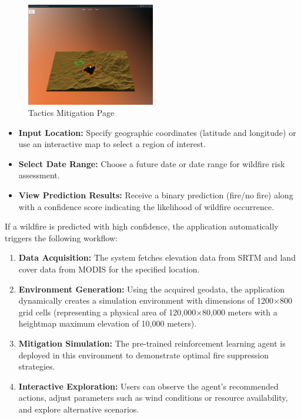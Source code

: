 \documentclass[conference]{IEEEtran}
\begin{document}
        \begin{figure}[H]
            \centering
            \includegraphics[width=0.5\textwidth]{tactix.png}
            \caption{Tactics Mitigation Page}
            \end{figure}
\begin{itemize}
    \item \textbf{Input Location:} Specify geographic coordinates (latitude and longitude) or use an interactive map to select a region of interest.
    
    \item \textbf{Select Date Range:} Choose a future date or date range for wildfire risk assessment.
    
    \item \textbf{View Prediction Results:} Receive a binary prediction (fire/no fire) along with a confidence score indicating the likelihood of wildfire occurrence.
\end{itemize}

\noindent
If a wildfire is predicted with high confidence, the application automatically triggers the following workflow:

\begin{enumerate}
    \item \textbf{Data Acquisition:} The system fetches elevation data from SRTM and land cover data from MODIS for the specified location.
    
    \item \textbf{Environment Generation:} Using the acquired geodata, the application dynamically creates a simulation environment with dimensions of 1200×800 grid cells (representing a physical area of 120,000×80,000 meters with a heightmap maximum elevation of 10,000 meters).
    
    \item \textbf{Mitigation Simulation:} The pre-trained reinforcement learning agent is deployed in this environment to demonstrate optimal fire suppression strategies.
    
    \item \textbf{Interactive Exploration:} Users can observe the agent's recommended actions, adjust parameters such as wind conditions or resource availability, and explore alternative scenarios.
\end{enumerate}
\end{document}
